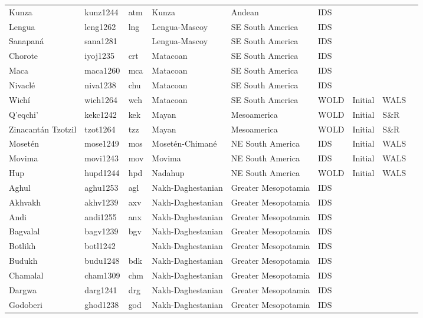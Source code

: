 \begin{longtable}{lllllllll}
  Kunza & kunz1244 & atm & Kunza & Andean & IDS &  &  &  \\ 
  Lengua & leng1262 & lng & Lengua-Mascoy & SE South America & IDS &  &  &  \\ 
  Sanapaná  & sana1281 &  & Lengua-Mascoy & SE South America & IDS &  &  &  \\ 
  Chorote & iyoj1235 & crt & Matacoan & SE South America & IDS &  &  &  \\ 
  Maca & maca1260 & mca & Matacoan & SE South America & IDS &  &  &  \\ 
  Nivaclé & niva1238 & chu & Matacoan & SE South America & IDS &  &  &  \\ 
  Wichí & wich1264 & wch & Matacoan & SE South America & WOLD & Initial & WALS &  \\ 
  Q'eqchi' & kekc1242 & kek & Mayan & Mesoamerica & WOLD & Initial & S\&R & \cite[84,96]{stewart_kekchi1980v2.pdf} \\ 
  Zinacantán Tzotzil & tzot1264 & tzz & Mayan & Mesoamerica & WOLD & Initial & S\&R &  \\ 
  Mosetén & mose1249 & mos & Mosetén-Chimané & NE South America & IDS & Initial & WALS &  \\ 
  Movima & movi1243 & mov & Movima & NE South America & IDS & Initial & WALS &  \\ 
  Hup & hupd1244 & hpd & Nadahup & NE South America & WOLD & Initial & WALS &  \\ 
  Aghul & aghu1253 & agl & Nakh-Daghestanian & Greater Mesopotamia & IDS &  &  &  \\ 
  Akhvakh  & akhv1239 & axv & Nakh-Daghestanian & Greater Mesopotamia & IDS &  &  &  \\ 
  Andi & andi1255 & anx & Nakh-Daghestanian & Greater Mesopotamia & IDS &  &  &  \\ 
  Bagvalal & bagv1239 & bgv & Nakh-Daghestanian & Greater Mesopotamia & IDS &  &  &  \\ 
  Botlikh & botl1242 &  & Nakh-Daghestanian & Greater Mesopotamia & IDS &  &  &  \\ 
  Budukh & budu1248 & bdk & Nakh-Daghestanian & Greater Mesopotamia & IDS &  &  &  \\ 
  Chamalal & cham1309 & chm & Nakh-Daghestanian & Greater Mesopotamia & IDS &  &  &  \\ 
  Dargwa & darg1241 & drg & Nakh-Daghestanian & Greater Mesopotamia & IDS &  &  &  \\ 
  Godoberi & ghod1238 & god & Nakh-Daghestanian & Greater Mesopotamia & IDS &  &  &  \\ 

\end{longtable}
